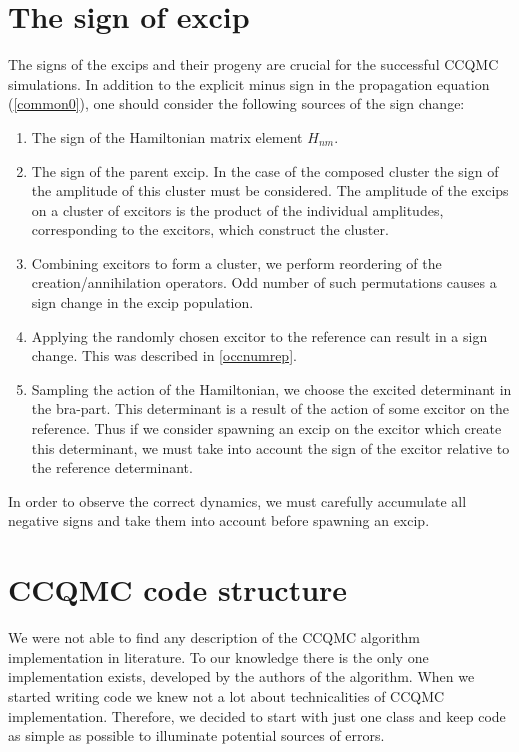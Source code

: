 \documentclass[twoside,english]{uiofysmaster}
\begin{document}
\section{The sign of excip}
 The signs of the excips and their progeny are crucial for the successful CCQMC simulations. In addition to the explicit minus sign in the propagation equation (\ref{common0}), one should consider the following sources of the sign change:
 
 \begin{enumerate}
 	
 	\item The sign of the Hamiltonian matrix element $H_{nm}$.
 	
 	\item The sign of the parent excip. In the case of the composed cluster the sign of the amplitude of this cluster must be considered. The amplitude of the excips on a cluster of excitors is the product of the individual amplitudes, corresponding to the excitors, which construct the cluster.
 	
 	\item Combining excitors to form a cluster, we perform reordering of the creation/annihilation operators. Odd number of such permutations causes a sign change in the excip population.
 	
 	\item Applying the randomly chosen excitor to the reference can result in a sign change. This was described in \autoref{occnumrep}.  
 	
 	\item Sampling the action of the Hamiltonian, we choose the excited determinant in the bra-part. This determinant is a result of the action of some excitor on the reference. Thus if we consider spawning an excip on the excitor which create this determinant, we must take into account the sign of the excitor relative to the reference determinant.
 \end{enumerate}
 
 In order to observe the correct dynamics, we must carefully accumulate all negative signs and take them into account before spawning an excip.


\section{CCQMC code structure}

 We were not able to find any description of the CCQMC algorithm implementation in literature. To our knowledge there is the only one implementation exists, developed by the authors of the algorithm. When we started writing code we knew not a lot about technicalities of CCQMC implementation. Therefore, we decided to start with just one class and keep code as simple as possible to illuminate potential sources of errors.
 
\end{document}
